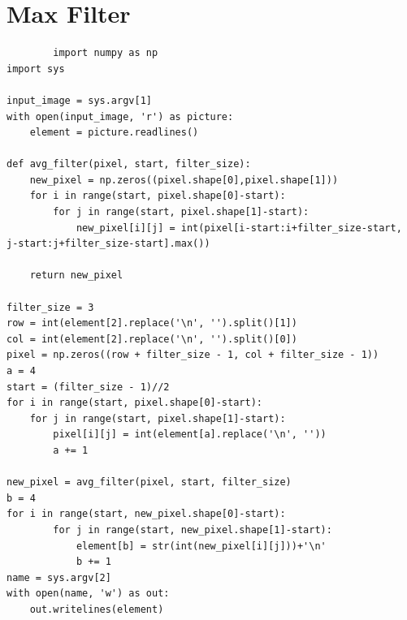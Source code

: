 \documentclass[a4paper,8pt]{article}
\begin{document}
        \section{Max Filter}
        \begin{verbatim}
        import numpy as np
import sys

input_image = sys.argv[1]
with open(input_image, 'r') as picture:
    element = picture.readlines()

def avg_filter(pixel, start, filter_size):
    new_pixel = np.zeros((pixel.shape[0],pixel.shape[1]))
    for i in range(start, pixel.shape[0]-start):
        for j in range(start, pixel.shape[1]-start):
            new_pixel[i][j] = int(pixel[i-start:i+filter_size-start, j-start:j+filter_size-start].max())

    return new_pixel

filter_size = 3
row = int(element[2].replace('\n', '').split()[1])
col = int(element[2].replace('\n', '').split()[0])
pixel = np.zeros((row + filter_size - 1, col + filter_size - 1))
a = 4
start = (filter_size - 1)//2
for i in range(start, pixel.shape[0]-start):
    for j in range(start, pixel.shape[1]-start):
        pixel[i][j] = int(element[a].replace('\n', ''))
        a += 1

new_pixel = avg_filter(pixel, start, filter_size)
b = 4
for i in range(start, new_pixel.shape[0]-start):
        for j in range(start, new_pixel.shape[1]-start):
            element[b] = str(int(new_pixel[i][j]))+'\n'
            b += 1
name = sys.argv[2]
with open(name, 'w') as out:
    out.writelines(element)


        \end{verbatim}
        
\end{document}
